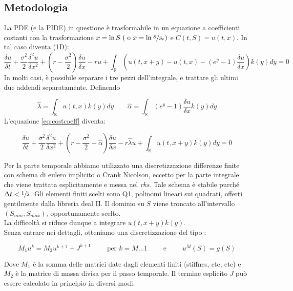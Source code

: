 \documentclass[a4paper,10pt]{article}
\newcommand{\der}[2]{\frac{\delta #1}{\delta #2}}
\newcommand{\dder}[2]{\frac{\delta^2 #1}{\delta #2^2}}
\begin{document}
\subsection{Metodologia}

La PDE (e la PIDE) in questione è trasformabile in un equazione a coefficienti costanti con la trasformazione $x=\ln{S} \; (\text{ o } x=\ln{\sfrac{S}{S_0}})$ e $C(t,S)=u(t,x)$. In tal caso diventa (1D):
{
\small
\begin{equation}
 \der{u}{t}+\frac{\sigma^2}{2}\dder{u}{x}+\left(r-\frac{\sigma^2}{2}\right)\der{u}{x}-ru+\int_\mathbb{R}\left( u(t,x+y)-u(t,x)-(e^y-1)\der{u}{x}\right)k(y)dy=0
\label{eq:costcoeff}
 \end{equation}
\normalsize
}
In molti casi, è possibile separare i tre pezzi dell'integrale, e trattare gli ultimi due addendi separatamente. Definendo 

\begin{equation*}
 \hat{\lambda}=\int_\mathbb{R}u(t,x)k(y)dy \qquad \hat{\alpha}=\int_\mathbb{R}(e^y-1)\der{u}{x}k(y)dy
\end{equation*}
L'equazione \eqref{eq:costcoeff} diventa: 

{

\begin{equation}
 \der{u}{t}+\frac{\sigma^2}{2}\dder{u}{x}+\left(r-\frac{\sigma^2}{2}-\hat{\alpha}\right)\der{u}{x}-r\hat{\lambda}u+\int_\mathbb{R}u(t,x+y)k(y)dy=0
\end{equation}
}

Per la parte temporale abbiamo utilizzato una discretizzazione differenze finite con schema di eulero implicito o Crank Nicolson, eccetto per la parte integrale che viene trattata esplicitamente e messa nel \emph{rhs}. Tale schema è stabile purché $\Delta t < \sfrac{1}{\hat{\lambda}}$. Gli elementi finiti scelti sono Q1, polinomi lineari sui quadrati, offerti gentilmente dalla libreria deal II. Il dominio su $S$ viene troncato all'intervallo $(S_{min},S_{max})$, opportunamente scelto. 
\\
La difficoltà si riduce dunque a integrare $u(t,x+y)k(y)$.
\\
Senza entrare nei dettagli, otteniamo una discretizzazione del tipo :

\begin{equation}
 M_1u^k=M_2u^{k+1}+J^{k+1}  \qquad \text{ per } k=M\dots1 \qquad \text{ e } \qquad u^{M}(S)=g(S) 
\end{equation}

Dove $M_1$ è la somma delle matrici date dagli elementi finiti (stiffnes, etc, etc) e $M_2$ è la matrice di massa divisa per il passo temporale. Il termine esplicito $J$ può essere calcolato in principio in diversi modi.
\end{document}
